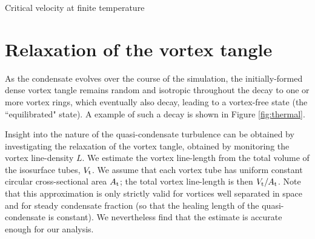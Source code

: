 \begin{chapter}{\label{cha:nonequib}Critical velocity at finite temperature}
\section{Relaxation of the vortex tangle}
As the condensate evolves over the course of the simulation, the initially-formed dense vortex tangle remains random and isotropic throughout the decay to one or more vortex rings, which eventually also decay, leading to a vortex-free state (the ``equilibrated" state). A example of such a decay is shown in Figure \ref{fig:thermal}.

Insight into the nature of the quasi-condensate turbulence can be obtained by investigating the relaxation of the vortex tangle, obtained by monitoring the vortex line-density $L$. We estimate the vortex line-length from the total volume of the isosurface tubes, $V_{\rm t}$. We assume that each vortex tube has uniform constant circular cross-sectional area $A_{\rm t}$; the total vortex line-length is then $V_{\rm t}/A_{\rm t}$. Note that this approximation is only strictly valid for vortices well separated in space and for steady condensate fraction (so that the healing length of the quasi-condensate is constant). We nevertheless find that the estimate is accurate enough for our analysis.


\end{chapter}
